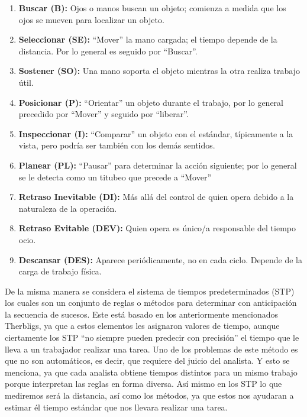 \begin{enumerate}
        \item \textbf{Buscar (B):} Ojos o manos buscan un objeto; comienza a medida que los ojos se mueven para localizar un objeto.
        \item \textbf{Seleccionar (SE):} “Mover” la mano cargada; el tiempo depende de la distancia. Por lo general es seguido por “Buscar”.
        \item \textbf{Sostener (SO):} Una mano soporta el objeto mientras la otra realiza trabajo útil.
        \item \textbf{Posicionar (P):} “Orientar” un objeto durante el trabajo, por lo general precedido por “Mover” y seguido por “liberar”.
        \item \textbf{Inspeccionar (I):} “Comparar” un objeto con el estándar, típicamente a la vista, pero podría ser también con los demás sentidos.
        \item \textbf{Planear (PL):} “Pausar” para determinar la acción siguiente; por lo general se le detecta como un titubeo que precede a “Mover”
        \item \textbf{Retraso Inevitable (DI):} Más allá del control de quien opera debido a la naturaleza de la operación.
        \item \textbf{Retraso Evitable (DEV):} Quien opera es único/a responsable del tiempo ocio.
        \item \textbf{Descansar (DES):} Aparece periódicamente, no en cada ciclo. Depende de la carga de trabajo física.
    
    \end{enumerate}
    
    De la misma manera se considera el sistema de tiempos predeterminados (STP) los cuales son un conjunto de reglas o métodos para determinar con anticipación la secuencia de sucesos. Este está basado en los anteriormente mencionados Therbligs, ya que a estos elementos les asignaron valores de tiempo, aunque ciertamente los STP “no siempre pueden predecir con precisión” el tiempo que le lleva a un trabajador realizar una tarea. Uno de los problemas de este método es que no son automáticos, es decir, que requiere del juicio del analista. Y esto se menciona, ya que cada analista obtiene tiempos distintos para un mismo trabajo porque interpretan las reglas en forma diversa. Así mismo en los STP lo que mediremos será la distancia, así como los métodos, ya que estos nos ayudaran a estimar él tiempo estándar que nos llevara realizar una tarea. 
    
    
    
